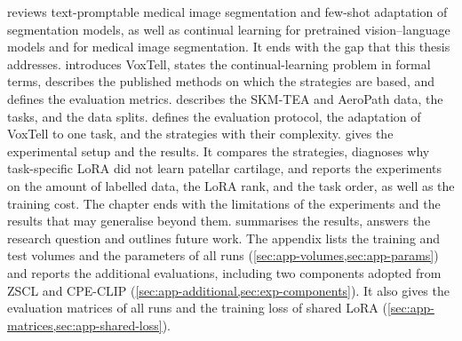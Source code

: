  reviews text-promptable medical image segmentation and few-shot adaptation of segmentation models, as well as continual learning for pretrained vision--language models and for medical image segmentation.
It ends with the gap that this thesis addresses.
 introduces VoxTell, states the continual-learning problem in formal terms, describes the published methods on which the strategies are based, and defines the evaluation metrics.
 describes the SKM-TEA and AeroPath data, the tasks, and the data splits.
 defines the evaluation protocol, the adaptation of VoxTell to one task, and the strategies with their complexity.
 gives the experimental setup and the results.
It compares the strategies, diagnoses why task-specific LoRA did not learn patellar cartilage, and reports the experiments on the amount of labelled data, the LoRA rank, and the task order, as well as the training cost.
The chapter ends with the limitations of the experiments and the results that may generalise beyond them.
 summarises the results, answers the research question and outlines future work.
The appendix lists the training and test volumes and the parameters of all runs (\cref{sec:app-volumes,sec:app-params}) and reports the additional evaluations, including two components adopted from ZSCL and CPE-CLIP (\cref{sec:app-additional,sec:exp-components}).
It also gives the evaluation matrices of all runs and the training loss of shared LoRA (\cref{sec:app-matrices,sec:app-shared-loss}).
